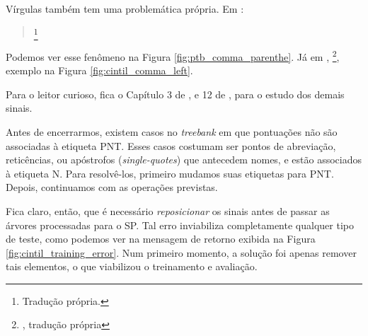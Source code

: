 Vírgulas também tem uma problemática própria. Em \cite[p~52]{bracketing_ptb}: 
\begin{quote}
    \footnote{ Tradução própria.}
\end{quote}

Podemos ver esse fenômeno na Figura \ref{fig:ptb_comma_parenthe}. Já em \cite[p~30]{cintil_handbook}, 
\footnote{, tradução própria}, exemplo na Figura \ref{fig:cintil_comma_left}.

\begin{center}
    
\end{center}

Para o leitor curioso, fica o Capítulo 3 de \cite{bracketing_ptb}, e 12 de \cite{cintil_handbook}, para o estudo dos demais sinais.

Antes de encerrarmos, existem casos no \textit{treebank} em que pontuações não são associadas à etiqueta PNT. Esses casos costumam ser pontos de abreviação, reticências, ou apóstrofos (\textit{single-quotes}) que antecedem nomes, e estão associados à etiqueta N. Para resolvê-los, primeiro mudamos suas etiquetas para PNT. Depois, continuamos com as operações previstas.

Fica claro, então, que é necessário \textit{reposicionar} os sinais antes de passar as árvores processadas para o SP. 
Tal erro inviabiliza completamente qualquer tipo de teste, como podemos ver na mensagem de retorno exibida na Figura \ref{fig:cintil_training_error}. Num primeiro momento, a solução foi apenas remover tais elementos, o que viabilizou o treinamento e avaliação.

\begin{center}
    
\end{center}

